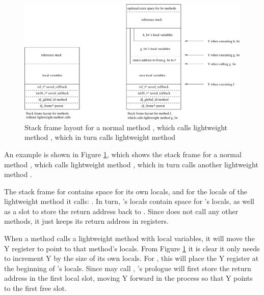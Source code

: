 
\begin{figure}
\centering
\includegraphics[width=0.95\linewidth]{stack-frame-lightweight-method.eps}
\caption{Stack frame layout for a normal method , which calls lightweight method , which in turn calls lightweight method }
\label{fig-stack-frame-lightweight-method}
\end{figure}

An example is shown in Figure \ref{fig-stack-frame-lightweight-method}, which shows the stack frame for a normal method , which calls lightweight method , which in turn calls another lightweight method .

The stack frame for  contains space for its own locals, and for the locals of the lightweight method it calls: . In turn, 's locals contain space for 's locals, as well as a slot to store the return address back to . Since  does not call any other methods, it just keeps its return address in registers.

When a method calls a lightweight method with local variables, it will move the Y register to point to that method's locals. From Figure \ref{fig-stack-frame-lightweight-method} it is clear it only needs to increment Y by the size of its own locals. For , this will place the Y register at the beginning of 's locals. Since  may call , 's prologue will first store the return address in the first local slot, moving Y forward in the process so that Y points to the first free slot.

